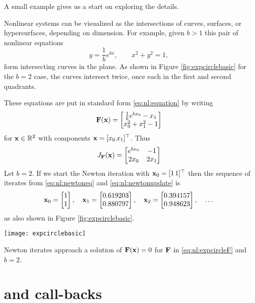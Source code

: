 A small example gives us a start on exploring the details.

\medskip\noindent\hrulefill
\begin{example}  Nonlinear systems can be visualized as the intersections of curves, surfaces, or hypersurfaces, depending on dimension.  For example, given $b > 1$ this pair of nonlinear equations
    $$y = \frac{1}{b} e^{bx}, \qquad x^2+y^2 = 1,$$
form intersecting curves in the plane.  As shown in Figure \ref{fig:expcirclebasic} for the $b=2$ case, the curves intersect twice, once each in the first and second quadrants.

These equations are put in standard form \eqref{eq:nl:equation} by writing
\begin{equation}
\label{eq:nl:expcircleF}
\mathbf{F}(\mathbf{x}) = \begin{bmatrix}
           \frac{1}{b} e^{b x_0} - x_1 \\
           x_0^2 + x_1^2 - 1
           \end{bmatrix}
\end{equation}
for $\mathbf{x}\in \mathbb{R}^2$ with components $\mathbf{x} = [x_0 \, x_1]^\top$.  Thus
\begin{equation}
J_{\mathbf{F}}(\mathbf{x}) = \begin{bmatrix}
    e^{b x_0} & -1 \\
    2 x_0   & 2 x_1 \end{bmatrix}
\end{equation}
Let $b=2$.  If we start the Newton iteration with $\mathbf{x}_0 = [1 \, 1]^\top$ then the sequence of iterates from \eqref{eq:nl:newtoneq} and \eqref{eq:nl:newtonupdate} is
    $${\mathbf{x}}_{0} = \begin{bmatrix} 1 \\ 1 \end{bmatrix}, \quad {\mathbf{x}}_{1} = \begin{bmatrix} 0.619203 \\ 0.880797 \end{bmatrix}, \quad {\mathbf{x}}_{2} = \begin{bmatrix} 0.394157 \\ 0.948623 \end{bmatrix}, \quad \dots$$
as also shown in Figure \ref{fig:expcirclebasic}.

\noindent\hrulefill
\end{example}

\begin{marginfigure}
\texttt{[image: expcirclebasic]}
\caption{Newton iterates approach a solution of $\mathbf{F}(\mathbf{x})=0$ for $\mathbf{F}$ in \eqref{eq:nl:expcircleF} and $b=2$.}
\label{fig:expcirclebasic}
\end{marginfigure}


\section{\pSNES and call-backs}

